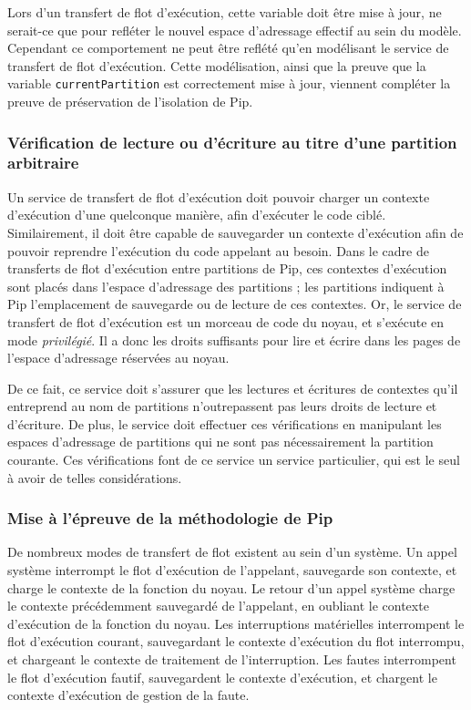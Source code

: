 		Lors d'un transfert de flot d'exécution, cette variable doit être mise à jour, ne serait-ce que pour refléter le nouvel espace d'adressage effectif au sein du modèle. Cependant ce comportement ne peut être reflété qu'en modélisant le service de transfert de flot d'exécution. Cette modélisation, ainsi que la preuve que la variable \texttt{currentPartition} est correctement mise à jour, viennent compléter la preuve de préservation de l'isolation de Pip.

		\subsubsection{Vérification de lecture ou d'écriture au titre d'une partition arbitraire}

		Un service de transfert de flot d'exécution doit pouvoir charger un contexte d'exécution d'une quelconque manière, afin d'exécuter le code ciblé. Similairement, il doit être capable de sauvegarder un contexte d'exécution afin de pouvoir reprendre l'exécution du code appelant au besoin. Dans le cadre de transferts de flot d'exécution entre partitions de Pip, ces contextes d'exécution sont placés dans l'espace d'adressage des partitions ; les partitions indiquent à Pip l'emplacement de sauvegarde ou de lecture de ces contextes. Or, le service de transfert de flot d'exécution est un morceau de code du noyau, et s'exécute en mode \emph{privilégié}. Il a donc les droits suffisants pour lire et écrire dans les pages de l'espace d'adressage réservées au noyau.

		De ce fait, ce service doit s'assurer que les lectures et écritures de contextes qu'il entreprend au nom de partitions n'outrepassent pas leurs droits de lecture et d'écriture. De plus, le service doit effectuer ces vérifications en manipulant les espaces d'adressage de partitions qui ne sont pas nécessairement la partition courante. Ces vérifications font de ce service un service particulier, qui est le seul à avoir de telles considérations.

		\subsubsection{Mise à l'épreuve de la méthodologie de Pip}
		
		De nombreux modes de transfert de flot existent au sein d'un système. Un appel système interrompt le flot d'exécution de l'appelant, sauvegarde son contexte, et charge le contexte de la fonction du noyau. Le retour d'un appel système charge le contexte précédemment sauvegardé de l'appelant, en oubliant le contexte d'exécution de la fonction du noyau. Les interruptions matérielles interrompent le flot d'exécution courant, sauvegardant le contexte d'exécution du flot interrompu, et chargeant le contexte de traitement de l'interruption. Les fautes interrompent le flot d'exécution fautif, sauvegardent le contexte d'exécution, et chargent le contexte d'exécution de gestion de la faute.

